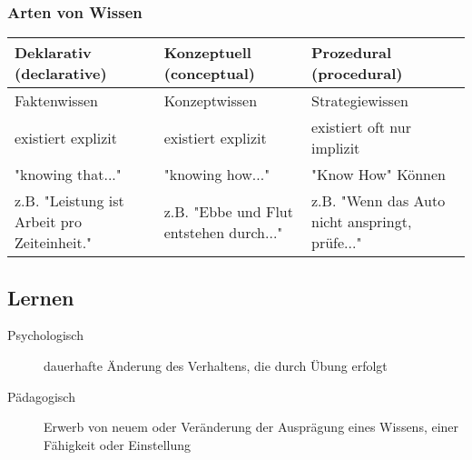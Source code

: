 \documentclass[a4paper]{article}
\begin{document}
\subsubsection{Arten von Wissen}
\begin{tabular}{ p{4.5cm} p{4.5cm} p{4.5cm} }\toprule[1.5pt]
 	\bf Deklarativ (declarative) 				
 	& \bf Konzeptuell (conceptual) 	
 	& \bf Prozedural (procedural) \\ \midrule
 	Faktenwissen 				
 	& Konzeptwissen			   	
 	& Strategiewissen \\ 
 	
 	existiert explizit 			
 	& existiert explizit		
 	& existiert oft nur implizit \\ 
 	
 	"knowing that..." 			
 	& "knowing how..." 	
 	& "Know How" Können \\ 
 	
 	z.B. "Leistung ist Arbeit pro Zeiteinheit." 
 	& z.B. "Ebbe und Flut entstehen durch..."
 	& z.B. "Wenn das Auto nicht anspringt, prüfe..." \\ 
 	\bottomrule[1.5pt]
\end{tabular}

\subsection{Lernen}
\begin{description}
	\item[Psychologisch] dauerhafte Änderung des Verhaltens, die durch Übung erfolgt
	\item[Pädagogisch] Erwerb von neuem oder Veränderung der Ausprägung eines Wissens, einer Fähigkeit oder Einstellung
\end{description}
\end{document}

